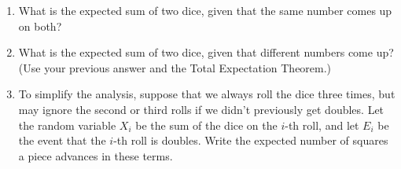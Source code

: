 \documentclass[12pt]{article}
\begin{document}
\begin{enumerate}
    \item What is the expected sum of two dice, given that the same
number comes up on both?


\item What is the expected sum of two dice, given that different
numbers come up?  (Use your previous answer and the Total Expectation
Theorem.)


\item To simplify the analysis, suppose that we always roll the dice
three times, but may ignore the second or third rolls if we didn't
previously get doubles.  Let the random variable $X_i$ be the sum of
the dice on the $i$-th roll, and let $E_i$ be the event that the
$i$-th roll is doubles.  Write the expected number of squares a piece
advances in these terms.


\end{enumerate}
\end{document}
